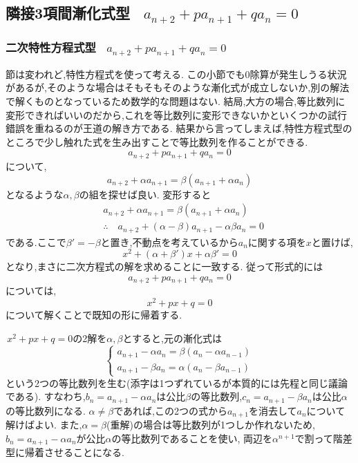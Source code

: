 
\subsection{\texorpdfstring{隣接3項間漸化式型 \, $\displaystyle a_{n+2}+pa_{n+1}+qa_n=0$}{隣接3項間漸化式型}}\label{節：隣接3項間漸化式型}
  \subsubsection{\texorpdfstring{二次特性方程式型 \, $\displaystyle a_{n+2}+pa_{n+1}+qa_n=0$}{二次特性方程式型}}
    節は変われど,特性方程式を使って考える.
    この小節でも0除算が発生しうる状況があるが,そのような場合はそもそもそのような漸化式が成立しないか,別の解法で解くものとなっているため数学的な問題はない.
    結局,大方の場合,等比数列に変形できればいいのだから,これを等比数列に変形できないかといくつかの試行錯誤を重ねるのが王道の解き方である.
    結果から言ってしまえば,特性方程式型のところで少し触れた式を生み出すことで等比数列を作ることができる.
    \[
      a_{n+2}+pa_{n+1}+qa_n=0
    \]
    について,
    \[
      a_{n+2}+\alpha a_{n+1}=\beta(a_{n+1}+\alpha a_{n})
    \]
    となるような$\alpha,\beta$の組を探せば良い.
    変形すると
    \begin{align*}
      &a_{n+2}+\alpha a_{n+1}=\beta(a_{n+1}+\alpha a_{n})\\
      &\therefore \quad a_{n+2}+(\alpha-\beta)a_{n+1}-\alpha\beta a_n=0
    \end{align*}
    である.ここで$\beta'=-\beta$と置き,不動点を考えているから$a_n$に関する項を$x$と置けば,
    \[
      x^2+(\alpha+\beta')x+\alpha\beta'=0      
    \]
    となり,まさに二次方程式の解を求めることに一致する.
    従って形式的には
    \[
      a_{n+2}+pa_{n+1}+qa_n=0
    \]
    については,
    \[
      x^2+px+q=0
    \]
    について解くことで既知の形に帰着する.

    \,$x^2+px+q=0$の2解を$\alpha,\beta$とすると,元の漸化式は
    \[
      \begin{cases}
        a_{n+1}-\alpha a_n=\beta(a_n-\alpha a_{n-1})\\
        a_{n+1}-\beta a_n=\alpha(a_n-\beta a_{n-1})
      \end{cases}
    \]
    という2つの等比数列を生む(添字は1つずれているが本質的には先程と同じ議論である).
    すなわち,$b_n=a_{n+1}-\alpha a_n$は公比$\beta$の等比数列,$c_n=a_{n+1}-\beta a_n$は公比$\alpha$の等比数列になる.
    $\alpha\ne\beta$であれば,この2つの式から$a_{n+1}$を消去して$a_n$について解けばよい.
    また,$\alpha=\beta$(重解)の場合は等比数列が1つしか作れないため,$b_n=a_{n+1}-\alpha a_n$が公比$\alpha$の等比数列であることを使い,
    両辺を$\alpha^{n+1}$で割って階差型に帰着させることになる.

